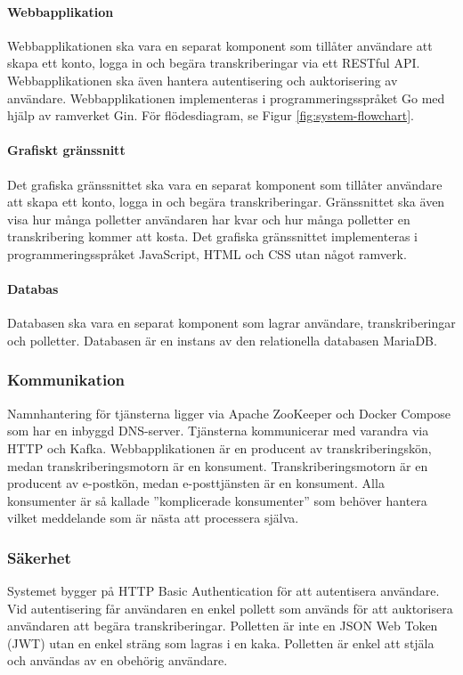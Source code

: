 \paragraph{Webbapplikation}
Webbapplikationen ska vara en separat komponent som tillåter användare att
skapa ett konto, logga in och begära transkriberingar via ett RESTful API.
Webbapplikationen ska även hantera autentisering och auktorisering av
användare. Webbapplikationen implementeras i programmeringsspråket Go med
hjälp av ramverket Gin. För flödesdiagram, se Figur \ref{fig:system-flowchart}.

\paragraph{Grafiskt gränssnitt}
Det grafiska gränssnittet ska vara en separat komponent som tillåter användare
att skapa ett konto, logga in och begära transkriberingar. Gränssnittet ska
även visa hur många polletter användaren har kvar och hur många polletter en
transkribering kommer att kosta. Det grafiska gränssnittet implementeras i
programmeringsspråket JavaScript, HTML och CSS utan något ramverk.

\paragraph{Databas}
Databasen ska vara en separat komponent som lagrar användare, transkriberingar
och polletter. Databasen är en instans av den relationella databasen MariaDB.

\subsubsection{Kommunikation}
Namnhantering för tjänsterna ligger via Apache ZooKeeper och Docker Compose
som har en inbyggd DNS-server. Tjänsterna kommunicerar med varandra via HTTP
och Kafka. Webbapplikationen är en producent av transkriberingskön, medan
transkriberingsmotorn är en konsument. Transkriberingsmotorn är en producent
av e-postkön, medan e-posttjänsten är en konsument. Alla konsumenter är så
kallade ''komplicerade konsumenter'' som behöver hantera vilket meddelande som
är nästa att processera själva.

\subsubsection{Säkerhet}
Systemet bygger på HTTP Basic Authentication för att autentisera användare.
Vid autentisering får användaren en enkel pollett som används för att
auktorisera användaren att begära transkriberingar. Polletten är inte en JSON
Web Token (JWT) utan en enkel sträng som lagras i en kaka. Polletten är enkel
att stjäla och användas av en obehörig användare. 

